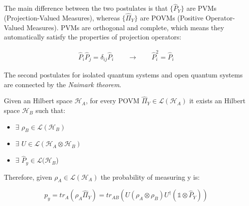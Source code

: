The main difference between the two postulates is that $\{\hat{P}_Y\}$ are PVMs (Projection-Valued Measures), whereas $\{\hat{\Pi}_Y\}$ are POVMs
(Positive Operator-Valued Measures).
PVMs are orthogonal and complete, which means they automatically satisfy the properties of projection operators:

\begin{align}
    \hat{P}_i \hat{P}_j = \delta_{ij} \hat{P}_i
    \qquad
    \rightarrow
    \qquad
    \hat{P}_i^2 = \hat{P}_i
\end{align}

The second postulates for isolated quantum systems and open quantum systems are connected by the \textit{Naimark theorem}.

\begin{theorem}
    Given an Hilbert space $\mathcal{H}_A$, for every POVM $\hat{\Pi}_Y \in \mathcal{L}(\mathcal{H}_A)$ it exists an 
    Hilbert space $\mathcal{H}_B$ such that:
    \begin{itemize}
        \item $\exists$ $\rho_B \in \mathcal{L}(\mathcal{H}_B)$
        \item $\exists$ $U \in \mathcal{L}(\mathcal{H}_A \otimes \mathcal{H}_B)$
        \item $\exists$ $\hat{P}_y \in \mathcal{L}(\mathcal{H}_B$)
    \end{itemize}
    Therefore, given $\rho_A \in \mathcal{L}(\mathcal{H}_A)$ the probability of measuring y is:

    \begin{equation}
        p_y = tr_A(\rho_A \hat{\Pi}_Y) = tr_{AB}(U (\rho_A \otimes \rho_B) U^{\dagger}(\mathds{1} \otimes \hat{P}_Y))
    \end{equation}
\end{theorem}

